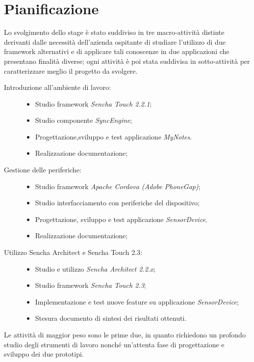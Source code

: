 \chapter{Pianificazione}\label{ch:pianificazione}
Lo svolgimento dello stage è stato suddiviso in tre macro-attività distinte derivanti dalle necessità dell'azienda ospitante di studiare l'utilizzo di due framework alternativi e di applicare tali conoscenze in due applicazioni che presentano finalità diverse; ogni attività è poi stata suddivisa in sotto-attività per caratterizzare meglio il progetto da svolgere.
\begin{description}
\item[Introduzione all'ambiente di lavoro:] \hfill
	\begin{itemize}
	\item Studio framework \emph{Sencha Touch 2.2.1};
	\item Studio componente \emph{SyncEngine};
	\item Progettazione,sviluppo e test applicazione \emph{MyNotes}.
	\item Realizzazione documentazione;
	\end{itemize}
\item[Gestione delle periferiche:] \hfill
	\begin{itemize}
	\item Studio framework \emph{Apache Cordova (Adobe PhoneGap)};
	\item Studio interfacciamento con periferiche del dispositivo;
	\item Progettazione, sviluppo e test applicazione \emph{SensorDevice}.
	\item Realizzazione documentazione;
	\end{itemize}
\item[Utilizzo Sencha Architect e Sencha Touch 2.3:] \hfill
	\begin{itemize}
	\item Studio e utilizzo \emph{Sencha Architect 2.2.x};
	\item Studio framework \emph{Sencha Touch 2.3};
	\item Implementazione e test nuove feature su applicazione \emph{SensorDevice};
	\item Stesura documento di sintesi dei risultati ottenuti.
	\end{itemize}
\end{description}
Le attività di maggior peso sono le prime due, in quanto richiedono un profondo studio degli strumenti di lavoro nonché un'attenta fase di progettazione e sviluppo dei due prototipi.

